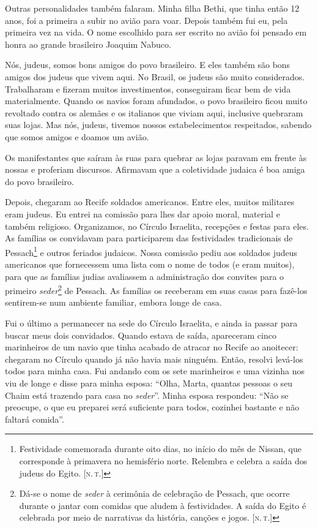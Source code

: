 Outras personalidades também falaram. Minha filha Bethi, que tinha
então 12 anos, foi a primeira a subir no avião para voar. Depois também fui eu, pela primeira vez na vida. O nome escolhido para ser escrito no avião foi pensado em honra ao grande brasileiro Joaquim Nabuco.

Nós, judeus, somos bons amigos do povo brasileiro. E eles também são bons
amigos dos judeus que vivem aqui. No Brasil, os judeus são muito
considerados. Trabalharam e fizeram muitos investimentos, conseguiram ficar bem de vida materialmente. Quando os navios foram afundados, o povo brasileiro ficou muito revoltado contra os alemães e
os italianos que viviam aqui, inclusive quebraram suas lojas. Mas nós, judeus,
tivemos nossos estabelecimentos respeitados, sabendo que somos amigos e
doamos um avião.

Os manifestantes que saíram às ruas para quebrar as lojas paravam em
frente às nossas e proferiam discursos. Afirmavam que a
coletividade judaica é boa amiga do povo brasileiro.

Depois, chegaram ao Recife soldados americanos. Entre eles, muitos
militares eram judeus. Eu entrei na comissão para lhes dar apoio moral,
material e também religioso. Organizamos, no Círculo Israelita,
recepções e festas para eles. As famílias os convidavam para
participarem das festividades tradicionais de Pessach\footnote{Festividade
  comemorada durante oito dias, no início do mês de Nissan, que
  corresponde à primavera no hemisfério norte. Relembra e celebra a
  saída dos judeus do Egito. {[}\textsc{n.\,t.}{]}} e outros feriados judaicos. Nossa comissão
pediu aos soldados judeus americanos que fornecessem uma lista com o
nome de todos (e eram muitos), para que as famílias
judias avaliassem a administração dos convites para o primeiro
\textit{seder}\footnote{Dá-se o nome de \textit{seder} à cerimônia de celebração de
  Pessach, que ocorre durante o jantar com comidas que aludem à festividades. A saída do Egito é celebrada por meio de narrativas da história, canções e jogos. {[}\textsc{n.\,t.}{]}} de Pessach. As famílias os receberam em suas casas para fazê-los sentirem-se num ambiente familiar, embora longe de casa.

Fui o último a permanecer na sede do Círculo Israelita, e ainda ia passar
para buscar meus dois convidados. Quando
estava de saída, apareceram cinco marinheiros de um navio que tinha
acabado de atracar no Recife ao anoitecer: chegaram no Círculo quando
já não havia mais ninguém. Então, resolvi levá-los todos para minha casa.
Fui andando com os sete marinheiros e uma vizinha nos viu de longe e
disse para minha esposa: ``Olha, Marta, quantas pessoas o seu Chaim está
trazendo para casa no \textit{seder}''. Minha esposa respondeu: ``Não se
preocupe, o que eu preparei será suficiente para todos, cozinhei
bastante e não faltará comida''. 

